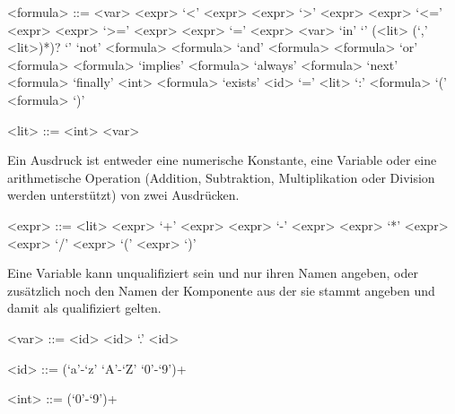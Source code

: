 \begin{grammar}
  <formula> ::= <var>
  \alt <expr> `<' <expr>
  \alt <expr> `>' <expr>
  \alt <expr> `<=' <expr>
  \alt <expr> `>=' <expr>
  \alt <expr> `=' <expr>
  \alt <var> `in' `{' (<lit> (`,' <lit>)*)? `}'
  \alt `not' <formula>
  \alt <formula> `and' <formula>
  \alt <formula> `or' <formula>
  \alt <formula> `implies' <formula>
  \alt `always' <formula>
  \alt `next' <formula>
  \alt `finally' <int> <formula>
  \alt `exists' <id> `=' <lit> `:' <formula>
  \alt `(' <formula> `)'
  
  <lit> ::= <int>
  \alt <var>
\end{grammar}
Ein Ausdruck ist entweder eine numerische Konstante, eine Variable oder eine arithmetische Operation (Addition, Subtraktion, Multiplikation oder Division werden unterstützt) von zwei Ausdrücken.
\begin{grammar}
  <expr> ::= <lit>
  \alt <expr> `+' <expr>
  \alt <expr> `-' <expr>
  \alt <expr> `*' <expr>
  \alt <expr> `/' <expr>
  \alt `(' <expr> `)'
\end{grammar}
Eine Variable kann unqualifiziert sein und nur ihren Namen angeben, oder zusätzlich noch den Namen der Komponente aus der sie stammt angeben und damit als qualifiziert gelten.
\begin{grammar}  
  <var> ::= <id>
  \alt <id> `.' <id>
  
  <id> ::= (`a'-`z' `A'-`Z' `0'-`9')+
  
  <int> ::= (`0'-`9')+
\end{grammar}
